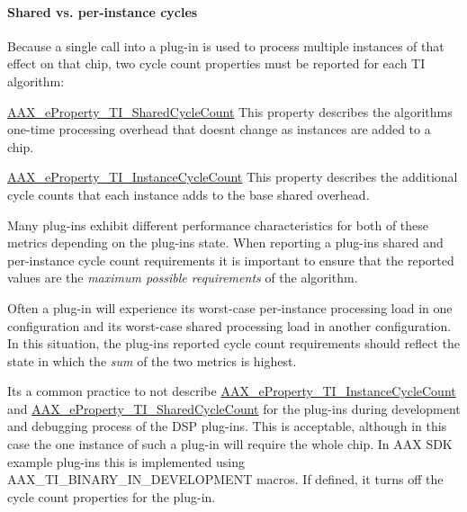 \hypertarget{a00362_subsubsection__shared_vs_perinstance_cycles_}{}\paragraph{Shared vs. per-\/instance cycles}\label{a00362_subsubsection__shared_vs_perinstance_cycles_}
 Because a single call into a plug-\/in is used to process multiple instances of that effect on that chip, two cycle count properties must be reported for each T\+I algorithm\+: 
\begin{DoxyEnumerate}
\item \hyperlink{a00283_a6571f4e41a5dd06e4067249228e2249ea3e5b289333ba49f5a33de40d89fa4ade}{A\+A\+X\+\_\+e\+Property\+\_\+\+T\+I\+\_\+\+Shared\+Cycle\+Count}  This property describes the algorithm\textquotesingle{}s one-\/time processing overhead that doesn\textquotesingle{}t change as instances are added to a chip.  
\item \hyperlink{a00283_a6571f4e41a5dd06e4067249228e2249ea5d8e5be9f3698a9c67a578c29da66405}{A\+A\+X\+\_\+e\+Property\+\_\+\+T\+I\+\_\+\+Instance\+Cycle\+Count}  This property describes the additional cycle counts that each instance adds to the base shared overhead.  
\end{DoxyEnumerate}

Many plug-\/ins exhibit different performance characteristics for both of these metrics depending on the plug-\/in\textquotesingle{}s state. When reporting a plug-\/in\textquotesingle{}s shared and per-\/instance cycle count requirements it is important to ensure that the reported values are the {\itshape maximum possible requirements} of the algorithm.

Often a plug-\/in will experience its worst-\/case per-\/instance processing load in one configuration and its worst-\/case shared processing load in another configuration. In this situation, the plug-\/in\textquotesingle{}s reported cycle count requirements should reflect the state in which the {\itshape sum} of the two metrics is highest.

It\textquotesingle{}s a common practice to not describe \hyperlink{a00283_a6571f4e41a5dd06e4067249228e2249ea5d8e5be9f3698a9c67a578c29da66405}{A\+A\+X\+\_\+e\+Property\+\_\+\+T\+I\+\_\+\+Instance\+Cycle\+Count} and \hyperlink{a00283_a6571f4e41a5dd06e4067249228e2249ea3e5b289333ba49f5a33de40d89fa4ade}{A\+A\+X\+\_\+e\+Property\+\_\+\+T\+I\+\_\+\+Shared\+Cycle\+Count} for the plug-\/ins during development and debugging process of the D\+S\+P plug-\/ins. This is acceptable, although in this case the one instance of such a plug-\/in will require the whole chip. In A\+A\+X S\+D\+K example plug-\/ins this is implemented using {\ttfamily A\+A\+X\+\_\+\+T\+I\+\_\+\+B\+I\+N\+A\+R\+Y\+\_\+\+I\+N\+\_\+\+D\+E\+V\+E\+L\+O\+P\+M\+E\+N\+T} macros. If defined, it turns off the cycle count properties for the plug-\/in.

